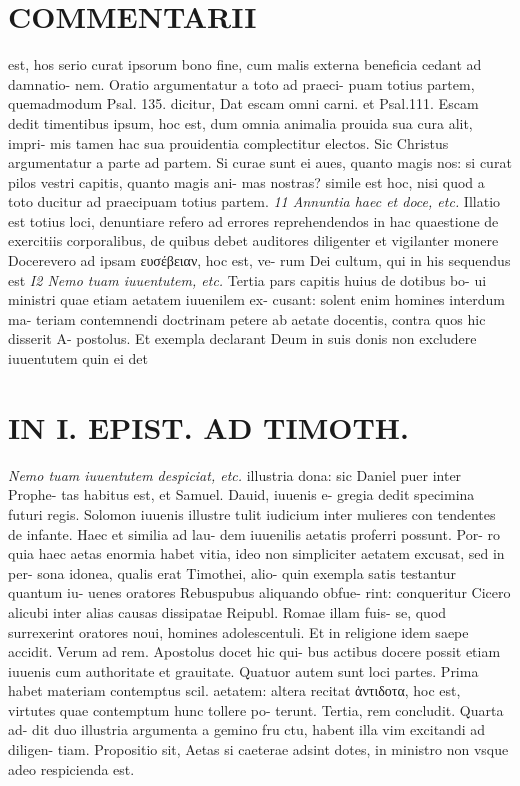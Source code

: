 \documentclass{article}
\begin{document}
\begin{pages}
\section*{COMMENTARII }
\marginpar{[ p.104 ]}\pstart est, hos serio curat ipsorum bono fine, cum malis externa beneficia cedant ad damnatio- nem. Oratio argumentatur a toto ad praeci- puam totius partem, quemadmodum Psal. 135. dicitur, Dat escam omni carni. et Psal.111. Escam dedit timentibus ipsum, hoc est, dum omnia animalia prouida sua cura alit, impri- mis tamen hac sua prouidentia complectitur electos. Sic Christus argumentatur a parte ad partem. Si curae sunt ei aues, quanto magis nos: si curat pilos vestri capitis, quanto magis ani- mas nostras? simile est hoc, nisi quod a toto ducitur ad praecipuam totius partem.  \pend
\textit{11 Annuntia haec et doce, etc. }\pstart Illatio est totius loci, denuntiare refero ad errores reprehendendos in hac quaestione de exercitiis corporalibus, de quibus debet auditores diligenter et vigilanter monere  \pend\pstart Docerevero ad ipsam ευσέβειαν, hoc est, ve- rum Dei cultum, qui in his sequendus est  \pend
\textit{I2 Nemo tuam iuuentutem, etc. }\pstart Tertia pars capitis huius de dotibus bo- ui ministri quae etiam aetatem iuuenilem ex- cusant: solent enim homines interdum ma- teriam contemnendi doctrinam petere ab aetate docentis, contra quos hic disserit A- postolus. Et exempla declarant Deum in suis donis non excludere iuuentutem quin ei det  \pend
\section*{IN I. EPIST. AD TIMOTH. }
\marginpar{[ p.105 ]}
\textit{Nemo tuam iuuentutem despiciat, etc. }\pstart illustria dona: sic Daniel puer inter Prophe- tas habitus est, et Samuel. Dauid, iuuenis e- gregia dedit specimina futuri regis. Solomon iuuenis illustre tulit iudicium inter mulieres con tendentes de infante. Haec et similia ad lau- dem iuuenilis aetatis proferri possunt. Por- ro quia haec aetas enormia habet vitia, ideo non simpliciter aetatem excusat, sed in per- sona idonea, qualis erat Timothei, alio- quin exempla satis testantur quantum iu- uenes oratores Rebuspubus aliquando obfue- rint: conqueritur Cicero alicubi inter alias causas dissipatae Reipubl. Romae illam fuis- se, quod surrexerint oratores noui, homines adolescentuli. Et in religione idem saepe accidit.  \pend\pstart Verum ad rem. Apostolus docet hic qui- bus actibus docere possit etiam iuuenis cum authoritate et grauitate. Quatuor autem sunt loci partes. Prima habet materiam contemptus scil. aetatem: altera recitat ἀντιδοτα, hoc est, virtutes quae contemptum hunc tollere po- terunt. Tertia, rem concludit. Quarta ad- dit duo illustria argumenta a gemino fru ctu, habent illa vim excitandi ad diligen- tiam.  \pend\pstart Propositio sit, Aetas si caeterae adsint dotes, in ministro non vsque adeo respicienda est.  \pend

\end{pages}
\end{document}
